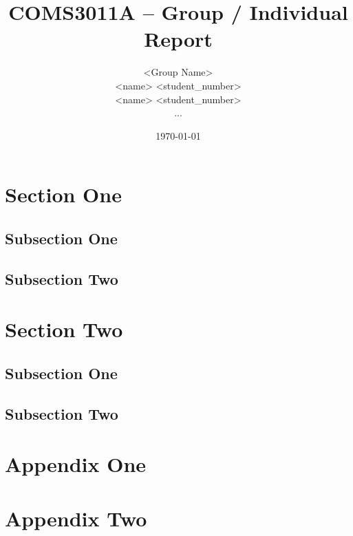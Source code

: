 \usepackage[
    style=authoryear
]{biblatex}
\usepackage{hyperref}
\usepackage{subcaption}
\usepackage{graphicx}
\usepackage{tikz}
\usetikzlibrary{matrix, positioning}
\usepackage{csvsimple}





\title{COMS3011A -- Group / Individual Report}
\author{ <Group Name> \\ <name> <student\_number> \\ <name> <student\_number> \\ ... }
\date{\today} 
\maketitle 
\pagestyle{fancy}
\fancyhf{}
\fancyhead[R]{\thepage}
{} 

\tableofcontents

\newpage
\section{Section One}
    \subsection{Subsection One}
    \subsection{Subsection Two}

\section{Section Two}
    \subsection{Subsection One}
    \subsection{Subsection Two}

\newpage
\appendix

\section{Appendix One}
\section{Appendix Two}

 

